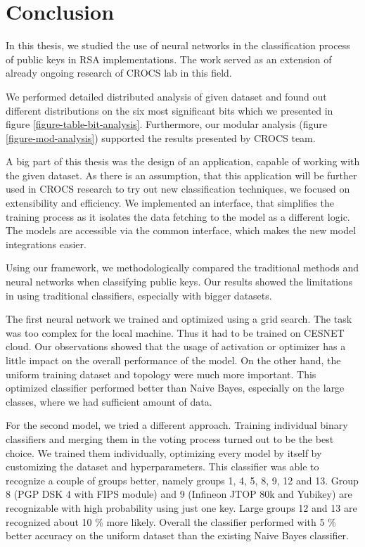 \chapter{Conclusion}

In this thesis, we studied the use of neural networks in the classification process of public keys in RSA implementations. The work served as an extension of already ongoing research of CROCS lab in this field. 

We performed detailed distributed analysis of given dataset and found out different distributions on the six most significant bits which we presented in figure \ref{figure-table-bit-analysis}. Furthermore, our modular analysis (figure \ref{figure-mod-analysis}) supported the results presented by CROCS team.

A big part of this thesis was the design of an application, capable of working with the given dataset. As there is an assumption, that this application will be further used in CROCS research to try out new classification techniques, we focused on extensibility and efficiency. We implemented an interface, that simplifies the training process as it isolates the data fetching to the model as a different logic. The models are accessible via the common interface, which makes the new model integrations easier.

Using our framework, we methodologically compared the traditional methods and neural networks when classifying public keys. Our results showed the limitations in using traditional classifiers, especially with bigger datasets.

The first neural network we trained and optimized using a grid search. The task was too complex for the local machine. Thus it had to be trained on CESNET cloud. Our observations showed that the usage of activation or optimizer has a little impact on the overall performance of the model. On the other hand, the uniform training dataset and topology were much more important. This optimized classifier performed better than Naive Bayes, especially on the large classes, where we had sufficient amount of data.

For the second model, we tried a different approach. Training individual binary classifiers and merging them in the voting process turned out to be the best choice. We trained them individually, optimizing every model by itself by customizing the dataset and hyperparameters. This classifier was able to recognize a couple of groups better, namely groups 1, 4, 5, 8, 9, 12 and 13. Group 8 (PGP DSK 4 with FIPS module) and 9 (Infineon JTOP 80k and Yubikey) are recognizable with high probability using just one key. Large groups 12 and 13 are recognized about 10 \% more likely. Overall the classifier performed with 5 \% better accuracy on the uniform dataset than the existing Naive Bayes classifier.

